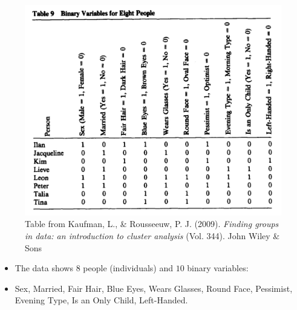\documentclass[
]{article}
\providecommand{\tightlist}{%
  \setlength{\itemsep}{0pt}\setlength{\parskip}{0pt}}
\begin{document}
\begin{figure}
\centering
\includegraphics{KAUFMANBinarydata.jpg}
\caption{Table from Kaufman, L., \& Rousseeuw, P. J. (2009).
\emph{Finding groups in data: an introduction to cluster analysis} (Vol.
344). John Wiley \& Sons}
\end{figure}

\begin{itemize}
\tightlist
\item
  The data shows \(8\) people (individuals) and \(10\) binary variables:
\item
  Sex, Married, Fair Hair, Blue Eyes, Wears Glasses, Round Face,
  Pessimist, Evening Type, Is an Only Child, Left-Handed.
\end{itemize}
\end{document}
